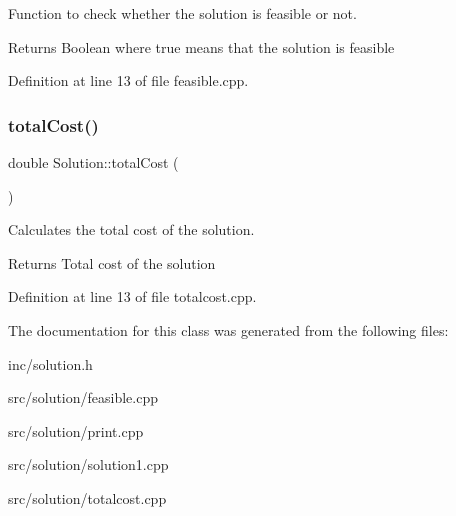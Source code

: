 Function to check whether the solution is feasible or not. 

\begin{DoxyReturn}{Returns}
Boolean where true means that the solution is feasible 
\end{DoxyReturn}


Definition at line 13 of file feasible.\+cpp.

\mbox{\label{class_solution_a227aaabdf34fbd2e01283728a5a344fe}} 
\subsubsection{\texorpdfstring{total\+Cost()}{totalCost()}}
{\footnotesize\ttfamily double Solution\+::total\+Cost (\begin{DoxyParamCaption}{ }\end{DoxyParamCaption})}



Calculates the total cost of the solution. 

\begin{DoxyReturn}{Returns}
Total cost of the solution 
\end{DoxyReturn}


Definition at line 13 of file totalcost.\+cpp.



The documentation for this class was generated from the following files\+:\begin{DoxyCompactItemize}
\item 
inc/solution.\+h\item 
src/solution/feasible.\+cpp\item 
src/solution/print.\+cpp\item 
src/solution/solution1.\+cpp\item 
src/solution/totalcost.\+cpp\end{DoxyCompactItemize}

